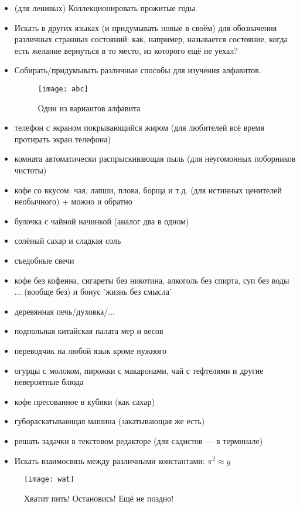 \begin{itemize}
    \item (для ленивых) Коллекционировать прожитые годы.
    \item Искать в других языках (и придумывать новые в своём) для обозначения различных странных состояний: как, например, называется состояние, когда есть желание вернуться в то место, из которого ещё не уехал?
    \item Собирать/придумывать различные способы для изучения алфавитов.
    
    \begin{figure}[ht!]
        \centering
        \texttt{[image: abc]}
        \caption{Один из вариантов алфавита}
    \end{figure}
    
    \item телефон с экраном покрывающийся жиром (для любителей всё время протирать экран телефона)
    \item комната автоматически распрыскивающая пыль (для неугомонных поборников чистоты)
    \item кофе со вкусом: чая, лапши, плова, борща и т.д. (для истинных ценителей необычного) + можно и обратно
    \item булочка с чайной начинкой (аналог два в одном)
    \item солёный сахар и сладкая соль
    \item съедобные свечи
    \item кофе без кофеина, сигареты без никотина, алкоголь без спирта, суп без воды ... (вообще без) и бонус 'жизнь без смысла'
    \item деревянная печь/духовка/...
    \item подпольная китайская палата мер и весов
    \item переводчик на любой язык кроме нужного
    \item огурцы с молоком, пирожки с макаронами, чай с тефтелями и другие невероятные блюда
    \item кофе пресованное в кубики (как сахар)
    \item губораскатывающая машина (закатывающая же есть)
    \item решать задачки в текстовом редакторе (для садистов --- в терминале)
    \item Искать взаимосвязь между различными константами: $\pi^2 \approx g$ %
\end{itemize}
\begin{figure}[ht!]
    \centering
    \texttt{[image: wat]}
    \caption{Хватит пить! Остановись! Ещё не поздно!}
\end{figure}
